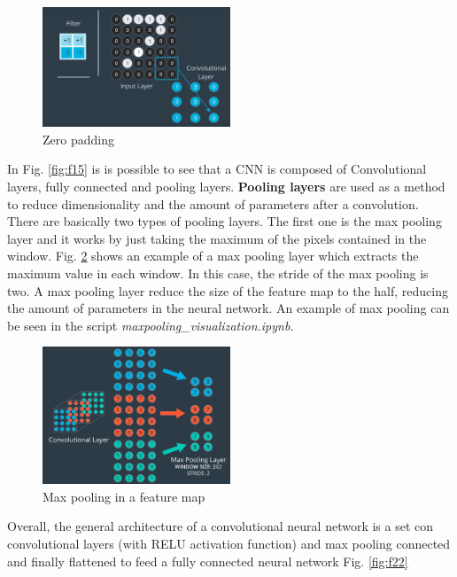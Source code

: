 \documentclass{article}
\begin{document}
\begin{figure}[ht]
    \centering
    \includegraphics[width=0.5\textwidth,height=0.5\textheight,keepaspectratio]{images/padding.png}
    \captionsetup{justification=centering}
    \caption{Zero padding}
    \label{fig:f20}
\end{figure}

In Fig. \ref{fig:f15} is is possible to see that a CNN is composed of Convolutional layers, fully connected and pooling layers. \textbf{Pooling layers} are used as a method to reduce dimensionality and the amount of parameters after a convolution. There are basically two types of pooling layers. The first one is the max pooling layer and it works by just taking the maximum of the pixels contained in the window. Fig. \ref{fig:f21} shows an example of a max pooling layer which extracts the maximum value in each window. In this case, the stride of the max pooling is two. A max pooling layer reduce the size of the feature map to the half, reducing the amount of parameters in the neural network. An example of max pooling can be seen in the script \textit{maxpooling\_visualization.ipynb}.

\begin{figure}[ht]
    \centering
    \includegraphics[width=0.5\textwidth,height=0.5\textheight,keepaspectratio]{images/max_pooling.png}
    \captionsetup{justification=centering}
    \caption{Max pooling in a feature map}
    \label{fig:f21}
\end{figure}

Overall, the general architecture of a convolutional neural network is a set con convolutional layers (with RELU activation function) and max pooling connected and finally flattened to feed a fully connected neural network Fig. \ref{fig:f22}
\end{document}
